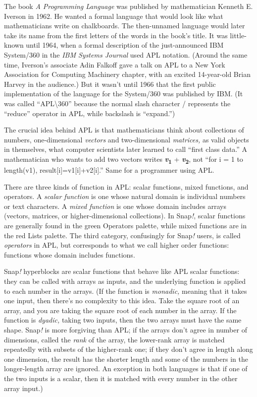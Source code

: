 The book \emph{A Programming Language} was published by mathematician
Kenneth E. Iverson in 1962. He wanted a formal language that would look
like what mathematicians write on chalkboards. The then-unnamed language
would later take its name from the first letters of the words in the
book's title. It was little-known until 1964, when a formal description
of the just-announced IBM System/360 in the \emph{IBM Systems Journal}
used APL notation. (Around the same time, Iverson's associate Adin
Falkoff gave a talk on APL to a New York Association for Computing
Machinery chapter, with an excited 14-year-old Brian Harvey in the
audience.) But it wasn't until 1966 that the first public implementation
of the language for the System/360 was published by IBM. (It was called
``APL\textbackslash360'' because the normal slash character / represents
the ``reduce'' operator in APL, while backslash is ``expand.'')

The crucial idea behind APL is that mathematicians think about
collections of numbers, one-dimensional \emph{vectors} and
two-dimensional \emph{matrices,} as valid objects in themselves, what
computer scientists later learned to call ``first class data.'' A
mathematician who wants to add two vectors writes
\textbf{\emph{v}\textsubscript{1}} + \textbf{\emph{v}\textsubscript{2}},
not ``for i = 1 to length(v1), result{[}i{]}=v1{[}i{]}+v2{[}i{]}.'' Same
for a programmer using APL.

There are three kinds of function in APL: scalar functions, mixed
functions, and operators. A \emph{scalar function} is one whose natural
domain is individual numbers or text characters. A \emph{mixed function}
is one whose domain includes arrays (vectors, matrices, or
higher-dimensional collections). In Snap\emph{!}, scalar functions are
generally found in the green Operators palette, while mixed functions
are in the red Lists palette. The third category, confusingly for
Snap\emph{!} users, is called \emph{operators} in APL, but corresponds
to what we call higher order functions: functions whose domain includes
functions.

Snap\emph{!} hyperblocks are scalar functions that behave like APL
scalar functions: they can be called with arrays as inputs, and the
underlying function is applied to each number in the arrays. (If the
function is \emph{monadic,} meaning that it takes one input, then
there's no complexity to this idea. Take the square root of an array,
and you are taking the square root of each number in the array. If the
function is \emph{dyadic,} taking two inputs, then the two arrays must
have the same shape. Snap\emph{!} is more forgiving than APL; if the
arrays don't agree in number of dimensions, called the \emph{rank} of
the array, the lower-rank array is matched repeatedly with subsets of
the higher-rank one; if they don't agree in length along one dimension,
the result has the shorter length and some of the numbers in the
longer-length array are ignored. An exception in both languages is that
if one of the two inputs is a scalar, then it is matched with every
number in the other array input.)

